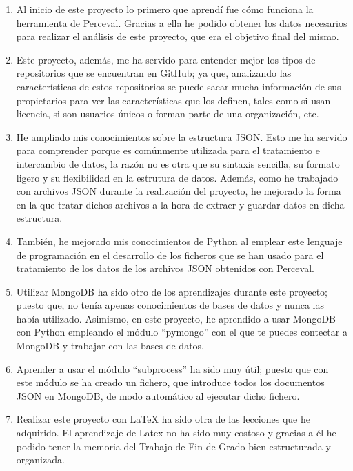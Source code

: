 \documentclass[a4paper, 12pt]{book}
\begin{document}
\begin{enumerate}
  \item  Al inicio de este proyecto lo primero que aprendí fue cómo funciona la herramienta de Perceval. Gracias a ella he podido obtener los datos necesarios para realizar el análisis de este proyecto, que era el objetivo final del mismo. 
  \item  Este proyecto, además, me ha servido para entender mejor los tipos de repositorios que se encuentran en GitHub; ya que, analizando las características de estos repositorios se puede sacar mucha información de sus propietarios para ver las características que los definen, tales como si usan licencia, si son usuarios únicos o forman parte de una organización, etc.
  \item  He ampliado mis conocimientos sobre la estructura JSON. Esto me ha servido para comprender porque es comúnmente utilizada para el tratamiento e intercambio de datos, la razón no es otra que su sintaxis sencilla, su formato ligero y su flexibilidad en la estrutura de datos. Además, como he trabajado con archivos JSON durante la realización del proyecto, he mejorado la forma en la que tratar dichos archivos a la hora de extraer y guardar datos en dicha estructura.  
  \item  También, he mejorado mis conocimientos de Python al emplear este lenguaje de programación en el desarrollo de los ficheros que se han usado para el tratamiento de los datos de los archivos JSON obtenidos con Perceval.    
  \item  Utilizar MongoDB ha sido otro de los aprendizajes durante este proyecto; puesto que, no tenía apenas conocimientos de bases de datos y nunca las había utilizado. Asimismo, en este proyecto, he aprendido a usar MongoDB con Python empleando el módulo ``pymongo'' con el que te puedes contectar a MongoDB y trabajar con las bases de datos.
  \item  Aprender a usar el módulo ``subprocess'' ha sido muy útil; puesto que con este módulo se ha creado un fichero, que introduce todos los documentos JSON en MongoDB, de modo automático al ejecutar dicho fichero.
  \item  Realizar este proyecto con LaTeX ha sido otra de las lecciones que he adquirido. El aprendizaje de Latex no ha sido muy costoso y gracias a él he podido tener la memoria del Trabajo de Fin de Grado bien estructurada y organizada.
\end{enumerate}
\end{document}
